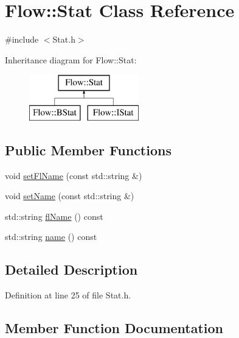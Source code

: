 \hypertarget{class_flow_1_1_stat}{}\section{Flow\+:\+:Stat Class Reference}
\label{class_flow_1_1_stat}


{\ttfamily \#include $<$Stat.\+h$>$}

Inheritance diagram for Flow\+:\+:Stat\+:\begin{figure}[H]
\begin{center}
\leavevmode
\includegraphics[height=2.000000cm]{class_flow_1_1_stat}
\end{center}
\end{figure}
\subsection*{Public Member Functions}
\begin{DoxyCompactItemize}
\item 
void \hyperlink{class_flow_1_1_stat_aecffa9e7e448ed7880a8f410cd3d96e7}{set\+Fl\+Name} (const std\+::string \&)
\item 
void \hyperlink{class_flow_1_1_stat_ab9d4b29ae4826165fea59f87b839c33e}{set\+Name} (const std\+::string \&)
\item 
std\+::string \hyperlink{class_flow_1_1_stat_a82e355b6052a2bc3433dc1f8e48204fc}{fl\+Name} () const
\item 
std\+::string \hyperlink{class_flow_1_1_stat_a3b09172b24c2ea0b6a040861b13ac16a}{name} () const
\end{DoxyCompactItemize}


\subsection{Detailed Description}


Definition at line 25 of file Stat.\+h.



\subsection{Member Function Documentation}
\hypertarget{class_flow_1_1_stat_a82e355b6052a2bc3433dc1f8e48204fc}{}\label{class_flow_1_1_stat_a82e355b6052a2bc3433dc1f8e48204fc} 
